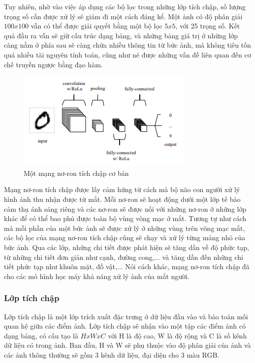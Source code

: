 Tuy nhiên, nhờ vào việc áp dụng các bộ lọc trong những lớp tích chập, số lượng trọng số cần được xử lý sẽ giảm đi một cách đáng kể. Một ảnh có độ phân giải $100x100$ vẫn có thể được giải quyết bằng một bộ lọc $5x5$, với 25 trọng số. Kết quả đầu ra vẫn sẽ giữ cấu trúc dạng bảng, và những bảng giá trị ở những lớp càng nằm ở phía sau sẽ càng chứa nhiều thông tin từ bức ảnh, mà không tiêu tốn quá nhiều tài nguyên tính toán, cũng như né được những vấn đề liên quan đến cơ chế truyền ngược bằng đạo hàm.
\begin{figure}[H]
    \centering
    \includegraphics{pics/Chapter3/conv_kernel2.png}
    \caption{Một mạng nơ-ron tích chập cơ bản \cite{o2015introduction}}
    \label{fig:enter-label}
\end{figure}
Mạng nơ-ron tích chập được lấy cảm hứng từ cách mà bộ não con người xử lý hình ảnh thu nhận được từ mắt.  Mỗi nơ-ron sẽ hoạt động dưới một lớp tế bào cảm thụ ánh sáng riêng và các nơ-ron sẽ được nối với những nơ-ron ở những lớp khác để có thể bao phủ được toàn bộ vùng võng mạc ở mắt. Tương tự như cách mà mỗi phần của một bức ảnh sẽ được xử lý ở những vùng trên võng mạc mắt, các bộ lọc của mạng nơ-ron tích chập cũng sẽ chạy và xử lý từng mảng nhỏ của bức ảnh. Qua các lớp, những chi tiết được phát hiện sẽ tăng dần về độ phức tạp, từ những chi tiết đơn giản như cạnh, đường cong,... và tăng dần đến những chi tiết phức tạp như khuôn mặt, đồ vật,... Nói cách khác, mạng nơ-ron tích chập đã cho các mô hình học máy khả năng xử lý ảnh của mắt người.

\subsubsection*{Lớp tích chập}
Lớp tích chập là một lớp trích xuất đặc trưng ở dữ liệu đầu vào và bảo toàn mối quan hệ giữa các điểm ảnh. Lớp tích chập sẽ nhận vào một tập các điểm ảnh có dạng bảng, có cấu tạo là $HxWxC$ với H là độ cao, W là độ rộng và C là số kênh dữ liệu có trong ảnh. Ban đầu, H và W sẽ phụ thuộc vào độ phân giải của ảnh và các ảnh thông thường sẽ gồm 3 kênh dữ liệu, đại diện cho 3 màu RGB.


